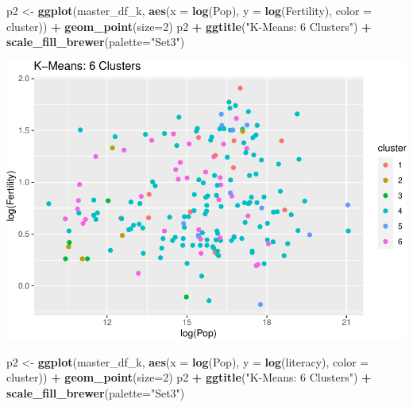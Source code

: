\documentclass[]{article}
\newenvironment{Shaded}{\begin{snugshade}}{\end{snugshade}}
\newcommand{\DataTypeTok}[1]{\textcolor[rgb]{0.13,0.29,0.53}{#1}}
\newcommand{\DecValTok}[1]{\textcolor[rgb]{0.00,0.00,0.81}{#1}}
\newcommand{\KeywordTok}[1]{\textcolor[rgb]{0.13,0.29,0.53}{\textbf{#1}}}
\newcommand{\NormalTok}[1]{#1}
\newcommand{\OperatorTok}[1]{\textcolor[rgb]{0.81,0.36,0.00}{\textbf{#1}}}
\newcommand{\StringTok}[1]{\textcolor[rgb]{0.31,0.60,0.02}{#1}}
\begin{document}
\begin{Shaded}
\begin{Highlighting}[]
\NormalTok{p2 <-}\StringTok{ }\KeywordTok{ggplot}\NormalTok{(master_df_k, }\KeywordTok{aes}\NormalTok{(}\DataTypeTok{x =} \KeywordTok{log}\NormalTok{(Pop), }\DataTypeTok{y =} \KeywordTok{log}\NormalTok{(Fertility), }\DataTypeTok{color =}\NormalTok{ cluster)) }\OperatorTok{+}
\StringTok{  }\KeywordTok{geom_point}\NormalTok{(}\DataTypeTok{size=}\DecValTok{2}\NormalTok{)}
\NormalTok{p2 }\OperatorTok{+}\StringTok{ }\KeywordTok{ggtitle}\NormalTok{(}\StringTok{"K-Means: 6 Clusters"}\NormalTok{) }\OperatorTok{+}\StringTok{ }\KeywordTok{scale_fill_brewer}\NormalTok{(}\DataTypeTok{palette=}\StringTok{"Set3"}\NormalTok{)}
\end{Highlighting}
\end{Shaded}

\includegraphics{eda_files/figure-latex/unnamed-chunk-26-6.pdf}

\begin{Shaded}
\begin{Highlighting}[]
\NormalTok{p2 <-}\StringTok{ }\KeywordTok{ggplot}\NormalTok{(master_df_k, }\KeywordTok{aes}\NormalTok{(}\DataTypeTok{x =} \KeywordTok{log}\NormalTok{(Pop), }\DataTypeTok{y =} \KeywordTok{log}\NormalTok{(literacy), }\DataTypeTok{color =}\NormalTok{ cluster)) }\OperatorTok{+}
\StringTok{  }\KeywordTok{geom_point}\NormalTok{(}\DataTypeTok{size=}\DecValTok{2}\NormalTok{)}
\NormalTok{p2 }\OperatorTok{+}\StringTok{ }\KeywordTok{ggtitle}\NormalTok{(}\StringTok{"K-Means: 6 Clusters"}\NormalTok{) }\OperatorTok{+}\StringTok{ }\KeywordTok{scale_fill_brewer}\NormalTok{(}\DataTypeTok{palette=}\StringTok{"Set3"}\NormalTok{)}
\end{Highlighting}
\end{Shaded}
\end{document}
